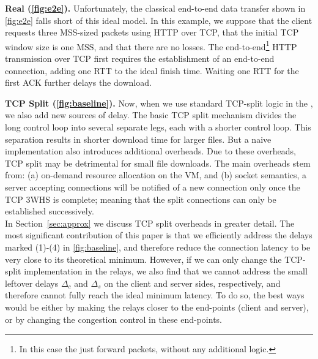 \textbf{Real (\autoref{fig:e2e}).}
Unfortunately, the classical end-to-end data transfer shown in \autoref{fig:e2e} falls short of this ideal model. In this example, we suppose that the client requests three MSS-sized packets using HTTP over TCP, that the initial TCP window size is one MSS, and that there are no losses. The end-to-end\footnote{In this case the \relays just forward packets, without any additional logic.} HTTP transmission over TCP first requires the establishment of an end-to-end connection, adding one RTT to the ideal finish time. Waiting one RTT for the first ACK further delays the download.

\textbf{TCP Split (\autoref{fig:baseline}).}
Now, when we use standard TCP-split logic in the \relays, we also add new sources of delay. 
The basic TCP split mechanism divides the long control loop into several separate legs, each with a shorter control loop. This separation results in shorter download time for larger files. But a naive implementation also introduces additional overheads. Due to these overheads, TCP split may be detrimental for small file downloads. The main overheads stem from: (a) on-demand resource allocation on the VM, and (b) socket semantics, a server accepting connections will be notified of a new connection only once the TCP 3WHS is complete; meaning that the split connections can only be established successively.\\
In Section~\ref{sec:approx} we discuss TCP split overheads in greater detail.  The most significant contribution of this paper is that we efficiently address the delays marked (1)-(4) in \autoref{fig:baseline}, and therefore reduce the connection latency to be very close to its theoretical minimum. However, if we can only change the TCP-split implementation in the relays, we also find that we cannot address the small leftover delays $\Delta_c$ and $\Delta_s$ on the client and server sides, respectively, and therefore cannot fully reach the ideal minimum latency. To do so, the best ways would be either by making the relays closer to the end-points (client and server), or by changing the congestion control in these end-points. %


